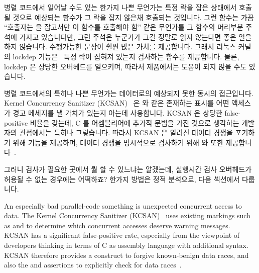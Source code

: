 병렬 코드에서 일어날 수도 있는 한가지 나쁜 무언가는 특정 락을 잡은 상태에서
호출될 것으로 예상되는 함수가 그 락을 잡지 않은채 호출되는 것입니다.
그런 함수는 가끔 ``호출자는  을 잡고서만 이 함수를 호출해야 함''
같은 무언가를 그 함수의 머리부분 주석에 가지고 있습니다만, 그런 주석은 누군가가
그걸 정말로 읽지 않는다면 좋은 일을 하지 않습니다.
수행가능한 문장이 훨씬 많은 가치를 제공합니다.
그래서 리눅스 커널의 lockdep
기능은~\cite{JonathanCorbet2006lockdep,StevenRostedt2011locdepCryptic}  특정
락이 잡혀져 있는지 검사하는  함수를 제공합니다.
물론, lockdep 은 상당한 오버헤드를 일으키며, 따라서 제품에서는 도움이 되지 않을
수도 있습니다.

병렬 코드에서의 특히나 나쁜 무언가는 데이터로의 예상되지 못한 동시의
접근입니다.
Kernel Concurrency Sanitizer (KCSAN)~\cite{JonathanCorbet2019KCSAN} 은
 와  같은 존재하는 표시를 어떤 액세스가 경고
메세지를 낼 가치가 있는지 아는데 사용합니다.
KCSAN 은 상당한 false-positive 비율을 갖는데, C 를 어셈블리어에 추가적 문법을
가진 것으로 생각하는 개발자의 관점에서는 특히나 그렇습니다.
따라서 KCSAN 은 알려진 데이터 경쟁을 포기하기 위해  기능을
제공하며, 데이터 경쟁을 명시적으로 검사하기 위해 
와  또한
제공합니다~\cite{MarcoElver2020FearDataRaceDetector1,MarcoElver2020FearDataRaceDetector2}.

그러니 검사가 필요한 곳에서 뭘 할 수 있느냐는 알겠는데, 실행시간 검사
오버헤드가 허용될 수 없는 경우에는 어떡하죠?
한가지 방법은 정적 분석으로, 다음 섹션에서 다룹니다.

\iffalse

An especially bad parallel-code something is unexpected concurrent
access to data.
The Kernel Concurrency Sanitizer (KCSAN)~\cite{JonathanCorbet2019KCSAN}
uses existing markings such as  and 
to determine which concurrent accesses deserve warning messages.
KCSAN has a significant false-positive rate, especially from the
viewpoint of developers thinking in terms of C as assembly language
with additional syntax.
KCSAN therefore provides a  construct to forgive
known-benign data races, and also the 
and  assertions to explicitly check
for data races~\cite{MarcoElver2020FearDataRaceDetector1,MarcoElver2020FearDataRaceDetector2}.

